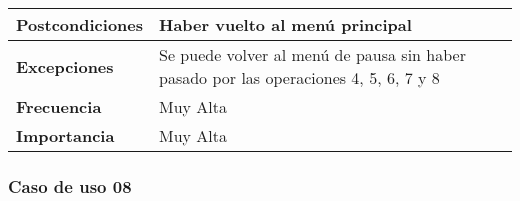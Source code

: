 \begin{longtable}{l|l}
\begin{minipage}{0.25\columnwidth}
\textbf{Postcondiciones} 
\end{minipage}
&
\begin{minipage}{0.65\columnwidth}
Haber vuelto al menú principal
\end{minipage}
\\ \hline

\begin{minipage}{0.25\columnwidth}
\textbf{Excepciones} 
\end{minipage}
&
\begin{minipage}{0.65\columnwidth}
Se puede volver al menú de pausa sin haber pasado por las operaciones 4, 5, 6, 7 y 8
\end{minipage}
\\ \hline

\begin{minipage}{0.25\columnwidth}
\textbf{Frecuencia} 
\end{minipage}
&
\begin{minipage}{0.65\columnwidth}
Muy Alta
\end{minipage}
\\ \hline

\begin{minipage}{0.25\columnwidth}
\textbf{Importancia} 
\end{minipage}
&
\begin{minipage}{0.65\columnwidth}
Muy Alta
\end{minipage}
\\ \hline
\end{longtable}

\subsubsection{Caso de uso 08}

